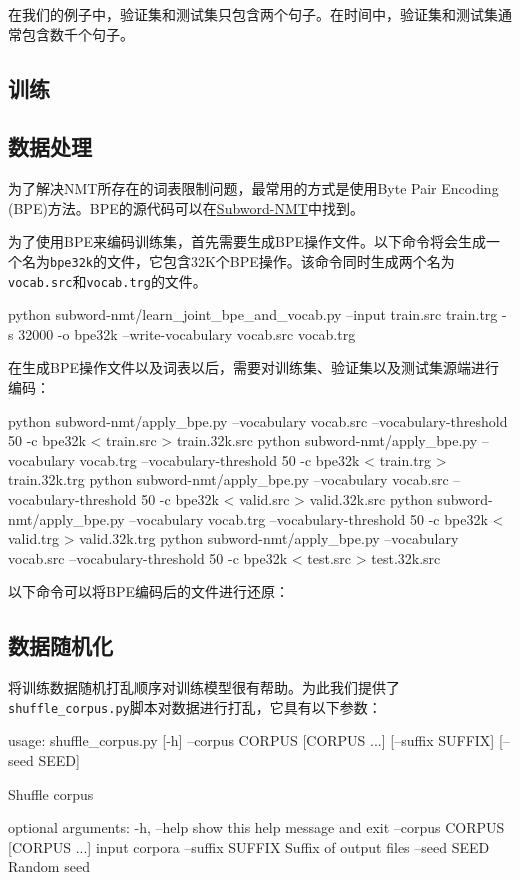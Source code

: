 \documentclass{article}
\begin{document}
在我们的例子中，验证集和测试集只包含两个句子。在时间中，验证集和测试集通常包含数千个句子。

\subsection{训练}

\subsection{数据处理}
为了解决NMT所存在的词表限制问题，最常用的方式是使用Byte Pair Encoding (BPE)方法。BPE的源代码可以在\href{https://github.com/rsennrich/subword-nmt}{Subword-NMT}中找到。

为了使用BPE来编码训练集，首先需要生成BPE操作文件。以下命令将会生成一个名为\verb|bpe32k|的文件，它包含32K个BPE操作。该命令同时生成两个名为\verb|vocab.src|和\verb|vocab.trg|的文件。
\begin{everbatim}
python subword-nmt/learn_joint_bpe_and_vocab.py 
  --input train.src train.trg -s 32000 -o bpe32k 
  --write-vocabulary vocab.src vocab.trg
\end{everbatim}

在生成BPE操作文件以及词表以后，需要对训练集、验证集以及测试集源端进行编码：
\begin{everbatim}
  python subword-nmt/apply_bpe.py 
    --vocabulary vocab.src 
    --vocabulary-threshold 50 
    -c bpe32k < train.src > train.32k.src
  python subword-nmt/apply_bpe.py
    --vocabulary vocab.trg 
    --vocabulary-threshold 50
    -c bpe32k < train.trg > train.32k.trg
  python subword-nmt/apply_bpe.py
    --vocabulary vocab.src
    --vocabulary-threshold 50
    -c bpe32k < valid.src > valid.32k.src
  python subword-nmt/apply_bpe.py 
    --vocabulary vocab.trg --vocabulary-threshold 50 
    -c bpe32k < valid.trg > valid.32k.trg
  python subword-nmt/apply_bpe.py
    --vocabulary vocab.src 
    --vocabulary-threshold 50 
    -c bpe32k < test.src > test.32k.src
\end{everbatim}

以下命令可以将BPE编码后的文件进行还原：


\subsection{数据随机化}
将训练数据随机打乱顺序对训练模型很有帮助。为此我们提供了\verb|shuffle_corpus.py|脚本对数据进行打乱，它具有以下参数：
\begin{everbatim}
usage: shuffle_corpus.py [-h] --corpus CORPUS [CORPUS ...] 
                         [--suffix SUFFIX]
                         [--seed SEED]

Shuffle corpus

optional arguments:
  -h, --help            show this help message and exit
  --corpus CORPUS [CORPUS ...]
                        input corpora
  --suffix SUFFIX       Suffix of output files
  --seed SEED           Random seed
\end{everbatim}
\end{document}
